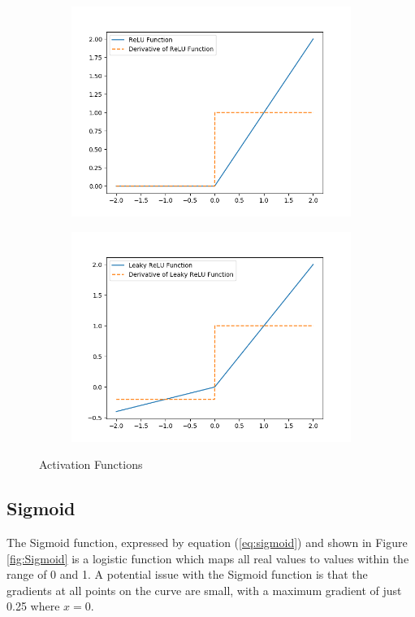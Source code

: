 \begin{figure}[h]
\begin{subfigure}[b]{0.49\textwidth}
        \includegraphics[width=\textwidth]{figures/dl/relu.png}
        \label{fig:ReLU}
    \end{subfigure}
    \begin{subfigure}[b]{0.49\textwidth}
        \includegraphics[width=\textwidth]{figures/dl/lrelu.png}
        \label{fig:LeakyReLU}
    \end{subfigure}
    \caption{Activation Functions}\label{fig:activations}
\end{figure}

\subsection{Sigmoid}
The Sigmoid function, expressed by equation (\ref{eq:sigmoid}) and shown in Figure \ref{fig:Sigmoid} is a logistic function which maps all real values to values within the range of 0 and 1.
A potential issue with the Sigmoid function is that the gradients at all points on the curve are small, with a maximum gradient of just 0.25 where $x = 0$.

